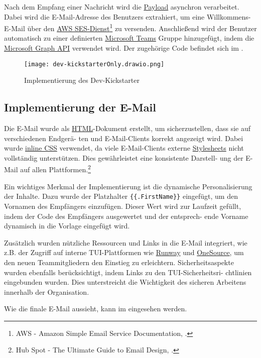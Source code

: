Nach dem Empfang einer Nachricht wird die \hyperlink{Payload}{\textcolor{AOBlau}{Payload}} asynchron verarbeitet. Dabei wird die E-Mail-Adresse des Benutzers extrahiert, um eine Willkommens-E-Mail über den \hyperlink{AWSSESClient}{\textcolor{AOBlau}{AWS SES-Dienst}}\footnote{AWS - Amazon Simple Email Service Documentation, \cite{aws2023ses}.} zu versenden. Anschließend wird der Benutzer automatisch zu einer definierten \hyperlink{MicrosoftTeams}{\textcolor{AOBlau}{Microsoft Teams}} Gruppe hinzugefügt, indem die \hyperlink{MicrosoftGraphAPI}{\textcolor{AOBlau}{Microsoft Graph API}} verwendet wird.
Der zugehörige Code befindet sich im .

\begin{figure}[h]
    \centering
    \texttt{[image: dev-kickstarterOnly.drawio.png]}
    \caption{Implementierung des Dev-Kickstarter}
\end{figure}

\subsection{Implementierung der E-Mail}
\label{sec:ImplementierungGeschaeftslogik}

Die E-Mail wurde als \hyperlink{HTML}{\textcolor{AOBlau}{HTML}}-Dokument erstellt, um sicherzustellen, dass sie auf verschiedenen Endgerä-
ten und E-Mail-Clients korrekt angezeigt wird. Dabei wurde \hyperlink{CSS}{\textcolor{AOBlau}{inline CSS}} verwendet, da viele E-Mail-Clients externe \hyperlink{CSS}{\textcolor{AOBlau}{Stylesheets}} nicht vollständig unterstützen. Dies gewährleistet eine konsistente Darstell-
ung der E-Mail auf allen Plattformen.\footnote{Hub Spot - The Ultimate Guide to Email Design, \cite{HubSpot}.}

Ein wichtiges Merkmal der Implementierung ist die dynamische Personalisierung der Inhalte. Dazu wurde der Platzhalter \texttt{\{\{.FirstName\}\}} eingefügt, um den Vornamen des Empfängers einzufügen. Dieser Wert wird zur Laufzeit gefüllt, indem der Code des Empfängers ausgewertet und der entsprech-
ende Vorname dynamisch in die Vorlage eingefügt wird.

Zusätzlich wurden nützliche Ressourcen und Links in die E-Mail integriert, wie z.B. der Zugriff auf interne TUI-Plattformen wie  \hyperlink{Runway}{\textcolor{AOBlau}{Runway}} und \hyperlink{OneSource}{\textcolor{AOBlau}{OneSource}}, um den neuen Teammitgliedern den Einstieg zu erleichtern. Sicherheitsaspekte wurden ebenfalls berücksichtigt, indem Links zu den TUI-Sicherheitsri-
chtlinien eingebunden wurden. Dies unterstreicht die Wichtigkeit des sicheren Arbeitens innerhalb der Organisation.

Wie die finale E-Mail aussieht, kann im  eingesehen werden.
